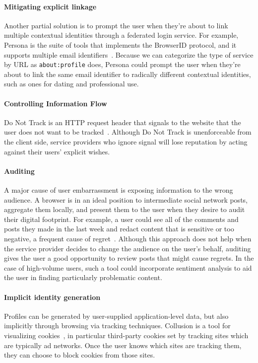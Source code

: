 \documentclass[10pt, conference, compsocconf]{IEEEtran}
\begin{document}
\paragraph{Mitigating explicit linkage}
Another partial solution is to prompt the user when they're about to link
multiple contextual identities through a federated login service. For example,
Persona is the suite of tools that implements the BrowserID protocol, and it
supports multiple email identifiers~\cite{browserid}.
Because we can categorize the type of service by URL
as \texttt{about:profile} does, Persona could prompt the user when they're about
to link the same email identifier to radically different contextual identities,
such as ones for dating and professional use.

\paragraph{Controlling Information Flow}
Do Not Track is an HTTP request header that signals to the website that the
user does not want to be tracked~\cite{dnt}. Although Do Not Track is
unenforceable from the client side, service providers who ignore signal will
lose reputation by acting against their users' explicit wishes.

\paragraph{Auditing}
A major cause of user embarrassment is exposing information to the wrong
audience. A browser is in an ideal position to intermediate social network
posts, aggregate them locally, and present them to the user when they desire to
audit their digital footprint.  For example, a user could see all of the
comments and posts they made in the last week and redact content that is
sensitive or too negative, a frequent cause of regret~\cite{wang}.  Although
this approach does not help when the service provider decides to change the
audience on the user's behalf, auditing gives the user a good opportunity to
review posts that might cause regrets. In the case of high-volume users, such a
tool could incorporate sentiment analysis to aid the user in finding
particularly problematic content.

\paragraph{Implicit identity generation}
Profiles can be generated by user-supplied application-level data, but also
implicitly through browsing via tracking techniques.  Collusion is a tool for
visualizing cookies~\cite{collusion}, in particular third-party cookies set by
tracking sites which are typically ad networks.  Once the user knows which
sites are tracking them, they can choose to block cookies from those sites.
\end{document}
